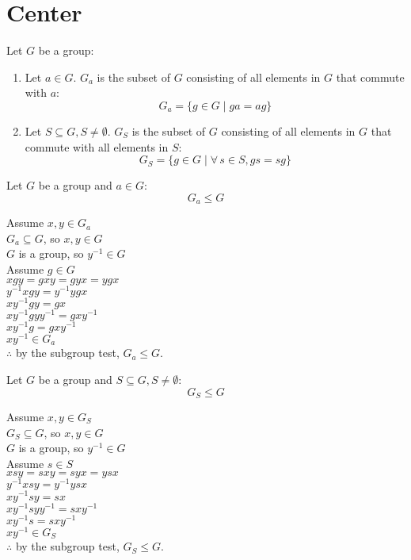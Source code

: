 \documentclass[letterpaper,12pt,fleqn]{article}
\begin{document}
\section*{Center}

\begin{definition}
  Let $G$ be a group:
  \begin{enumerate}
  \item Let $a\in G$. $G_a$ is the subset of $G$ consisting of all elements in
    $G$ that commute with $a$:
    \[G_a=\{g\in G\mid ga=ag\}\]

  \item Let $S\subseteq G,S\ne\emptyset$. $G_S$ is the subset of $G$ consisting
    of all elements in $G$ that commute with all elements in $S$:
    \[G_S=\{g\in G\mid\forall\,s\in S,gs=sg\}\]
  \end{enumerate}
\end{definition}

\begin{theorem}
  Let $G$ be a group and $a\in G$:
  \[G_a\le G\]
\end{theorem}

\begin{theproof}
  Assume $x,y\in G_a$ \\
  $G_a\subseteq G$, so $x,y\in G$ \\
  $G$ is a group, so $y^{-1}\in G$ \\
  Assume $g\in G$ \\
  $xgy=gxy=gyx=ygx$ \\
  $y^{-1}xgy=y^{-1}ygx$ \\
  $xy^{-1}gy=gx$ \\
  $xy^{-1}gyy^{-1}=gxy^{-1}$ \\
  $xy^{-1}g=gxy^{-1}$ \\
  $xy^{-1}\in G_a$ \\
  $\therefore$ by the subgroup test, $G_a\le G$.
\end{theproof}

\begin{theorem}
  Let $G$ be a group and $S\subseteq G,S\ne\emptyset$:
  \[G_S\le G\]
\end{theorem}

\begin{theproof}
  Assume $x,y\in G_S$ \\
  $G_S\subseteq G$, so $x,y\in G$ \\
  $G$ is a group, so $y^{-1}\in G$ \\
  Assume $s\in S$ \\
  $xsy=sxy=syx=ysx$ \\
  $y^{-1}xsy=y^{-1}ysx$ \\
  $xy^{-1}sy=sx$ \\
  $xy^{-1}syy^{-1}=sxy^{-1}$ \\
  $xy^{-1}s=sxy^{-1}$ \\
  $xy^{-1}\in G_S$ \\
  $\therefore$ by the subgroup test, $G_S\le G$.
\end{theproof}
\end{document}
